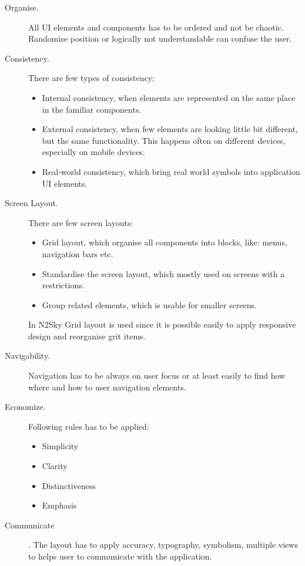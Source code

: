 \begin{description}
\item[Organise.]  All UI elements and components has to be ordered and not be chaotic. Randomise position or logically not understandable can confuse the user. 
\item[Consistency.] There are few types of consistency:
\begin{itemize}
\item Internal consistency, when elements are represented on the same place in the familiar components. 
\item External consistency, when few elements are looking little bit different, but the same functionality. This happens often on different devices, especially on mobile devices.
\item Real-world consistency, which bring real world symbols into application UI elements.
\end{itemize}
\item[Screen Layout.] There are few screen layouts: 
\begin{itemize}
\item Grid layout, which organise all components into blocks, like: menus, navigation bars etc. 
\item Standardise the screen layout, which mostly used on screens with a restrictions.
\item Group related elements, which is usable for smaller screens.
\end{itemize}

In N2Sky Grid layout is used since it is possible easily to apply responsive design and reorganise grit items. 

\item[Navigability.] Navigation has to be always on user focus or at least easily to find how where and how to user navigation elements.
\item[Economize.] Following rules has to be applied: 
\begin{itemize}
\item Simplicity
\item Clarity
\item Distinctiveness
\item Emphasis
\end{itemize}
\item[Communicate]. The layout has to apply accuracy, typography, symbolism, multiple views to helps user to communicate with the application.
\end{description}

